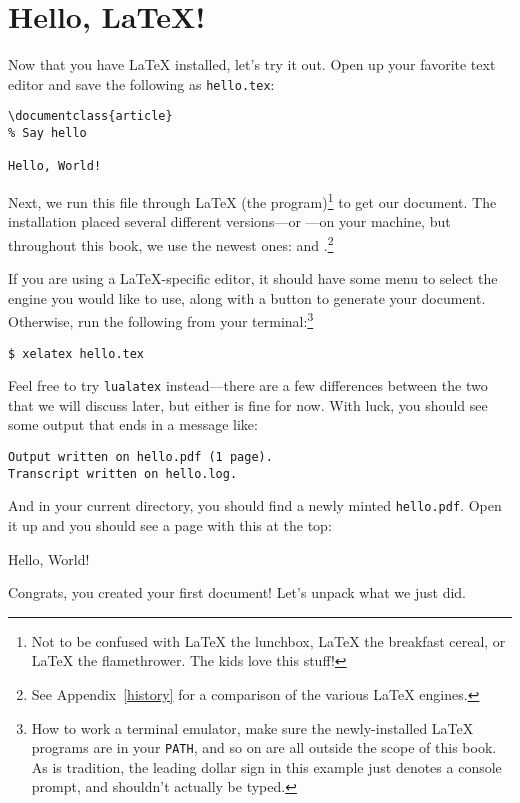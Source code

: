 \chapter{Hello, \texorpdfstring{\LaTeX}{LaTeX}!}
\label{hello}

Now that you have \LaTeX{} installed,
let's try it out.
Open up your favorite text editor and save the following as \texttt{hello.tex}:
\begin{leftfigure}
\begin{lstlisting}
\documentclass{article}
% Say hello

Hello, World!

\end{lstlisting}
\end{leftfigure}
Next, we run this file through \LaTeX{} (the program)\footnote{Not to be
confused with \LaTeX{} the lunchbox, \LaTeX{} the breakfast cereal,
or \LaTeX{} the flamethrower. The kids love this stuff!}
to get our document.
The installation placed several different versions---or
---on your machine,
but throughout this book, we use the newest ones:
\LuaLaTeX{} and \XeLaTeX.\punckern\footnote{See Appendix~\ref{history} for a
comparison of the various \LaTeX{} engines.}

If you are using a \LaTeX{}-specific editor, it should have some menu
to select the engine you would like to use,
along with a button to generate your document.
Otherwise, run the following from your terminal:\footnote{%
How to work a terminal emulator,
make sure the newly-installed \LaTeX{} programs are in your \texttt{PATH},
and so on are all outside the scope of this book.
As is tradition, the leading dollar sign in this example just denotes a console
prompt, and shouldn't actually be typed.}
\begin{leftfigure}
\begin{lstlisting}
$ xelatex hello.tex
\end{lstlisting}
\end{leftfigure}
Feel free to try \texttt{lualatex} instead---there are a few differences
between the two that we will discuss later, but either is fine for now.
With luck, you should see some output that ends in a message like:
\begin{leftfigure}
\begin{lstlisting}
Output written on hello.pdf (1 page).
Transcript written on hello.log.
\end{lstlisting}
\end{leftfigure}
And in your current directory, you should find a newly minted \texttt{hello.pdf}.
Open it up and you should see a page with this at the top:
\begin{leftfigure}
\lm Hello, World!
\end{leftfigure}
Congrats,
you created your first document!
Let's unpack what we just did.

